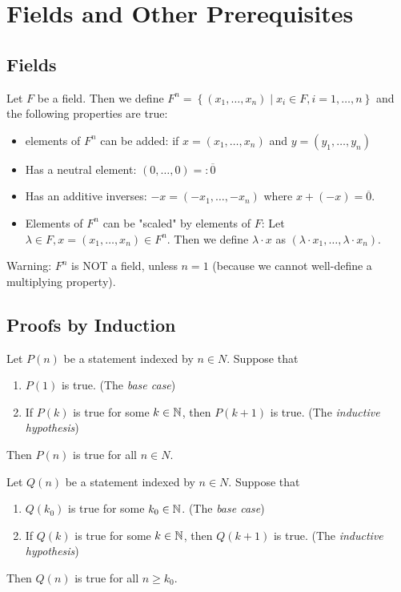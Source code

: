 \documentclass{memoir}
\begin{document}
\chapter{Fields and Other Prerequisites}	
\section{Fields}
\begin{defn}[Fields]
	
Let $F$ be a field. Then we define $F^{n} = \left\{ (x_1, \ldots,x_n) \mid x_i \in F, i=1,\ldots,n \right\}$ and the following properties are true:
\begin{itemize}
	\item elements of $F^{n}$ can be added: if $x = (x_1,\ldots,x_n)$ and $y = (y_1,\ldots,y_n)$
	\item Has a neutral element: $(0,\ldots,0) =: \overline{0}$
	\item Has an additive inverses: $-x = (-x_1,\ldots,-x_n)$ where $x + (-x) = \overline{0}$.
	\item Elements of $F^{n}$ can be "scaled" by elements of $F$: Let $\lambda \in F, x = (x_1,\ldots,x_n)\in F^{n}$. Then we define $\lambda \cdot x$ as $(\lambda \cdot x_1, \ldots, \lambda \cdot x_n)$. 
\end{itemize}
\end{defn}
Warning: $F^{n}$ is NOT a field, unless $n=1$ (because we cannot well-define a multiplying property).

\section{Proofs by Induction}

\begin{thm}
	Let $P(n)$ be a statement indexed by $n \in N$. Suppose that
	\begin{enumerate}
		\item $P(1)$ is true. (The \textit{base case})
		\item If $P(k)$ is true for some $k \in \mathbb{N}$, then $P(k+1)$ is true. (The \textit{inductive hypothesis})
	\end{enumerate}
	Then $P(n)$ is true for all $n \in N$.
\end{thm}
\begin{thm}
	Let $Q(n)$ be a statement indexed by $n \in N$. Suppose that
	\begin{enumerate}
		\item $Q(k_0)$ is true for some $k_0 \in \mathbb{N}$. (The \textit{base case})
		\item If $Q(k)$ is true for some $k \in \mathbb{N}$, then $Q(k+1)$ is true. (The \textit{inductive hypothesis})
	\end{enumerate}
	Then $Q(n)$ is true for all $n \geq k_0$.


\end{thm}
\end{document}
